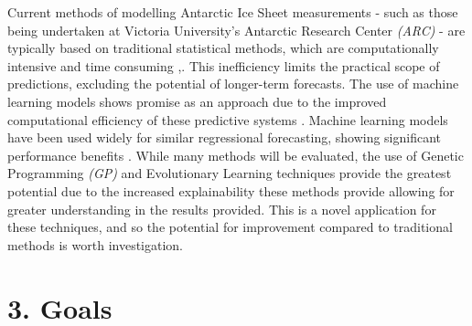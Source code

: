 \documentclass[11pt, a4paper, twoside, openright]{report}
\begin{document}
Current methods of modelling Antarctic Ice Sheet measurements
- such as those being undertaken at Victoria University's Antarctic 
Research Center \textit{(ARC)} - are typically based on
traditional statistical methods, which are computationally
intensive and time consuming \cite{huybrechts1988evolution},\cite{golledge2020long}. This inefficiency limits the
practical scope of predictions, excluding the potential of
longer-term forecasts. The use of machine learning models
shows promise as an approach due to the improved 
computational efficiency of these predictive systems
\cite{simeone2018brief}.
Machine learning models have been used widely for similar
regressional forecasting, showing significant performance
benefits \cite{simeone2018brief}.
While many methods will be evaluated, the use of 
Genetic Programming \textit{(GP)} 
and Evolutionary Learning techniques provide the 
greatest potential due to the increased explainability
these methods provide allowing for greater understanding in
the results provided. This is a novel application for
these techniques, and so the potential for improvement
compared to traditional methods is worth investigation.

\section*{3. Goals}
\end{document}
